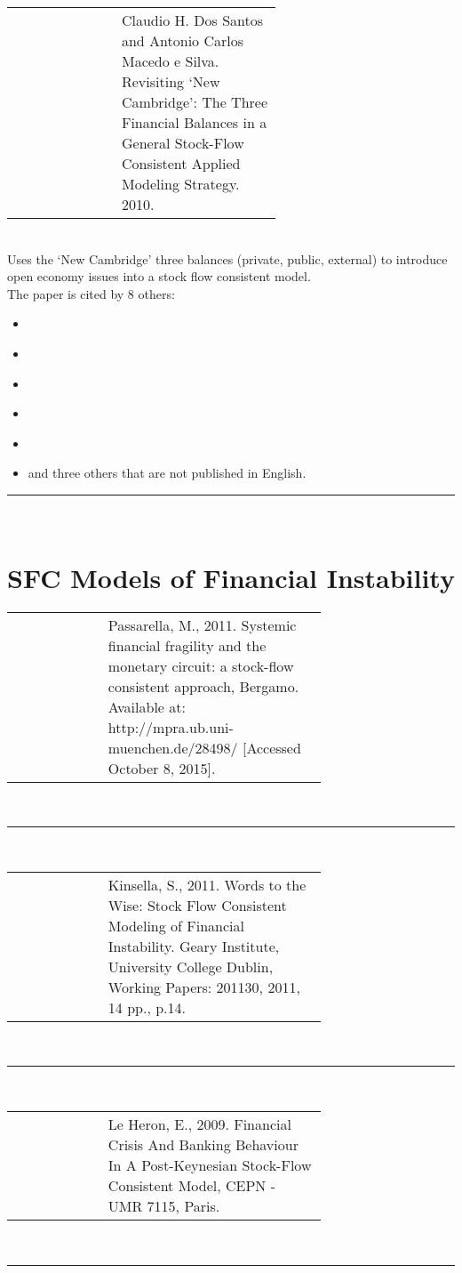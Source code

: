 \documentclass[twoside,a4paper,11pt]{article}
\begin{document}
\raggedright \begin{tabular}{lp{0.6\linewidth}}
\cite{DosSantos2010a} & Claudio H. Dos Santos and Antonio Carlos Macedo e Silva. Revisiting `New Cambridge': The Three Financial Balances in a General Stock-Flow Consistent Applied Modeling Strategy. 2010.
\end{tabular}\\[5pt]
Uses the `New Cambridge'  three balances (private, public, external) to introduce open economy issues into a stock flow consistent model.\\[5pt]
The paper is cited by 8 others:
\begin{itemize}
\item[] \cite{Cripps2011}
\item[] \cite{Shaikh2012}
\item[] \cite{Dafermos2015a}
\item[] \cite{Leite2015}
\item[] \cite{Michell2012}
\item[] and three others that are not published in English.
\end{itemize}
\centering \rule{5cm}{1pt}  \\[1cm]

\raggedright \section{SFC Models of  Financial Instability}
\begin{tabular}{lp{0.7\linewidth}}
\cite{Passarella2011a} & Passarella, M., 2011. Systemic financial fragility and the monetary circuit: a stock-flow consistent approach, Bergamo. Available at: http://mpra.ub.uni-muenchen.de/28498/ [Accessed October 8, 2015].
\end{tabular}\\[5pt]
\centering \rule{5cm}{1pt}  \\[1cm]

\raggedright\begin{tabular}{lp{0.7\linewidth}}
\cite{Kinsella2011} & Kinsella, S., 2011. Words to the Wise: Stock Flow Consistent Modeling of Financial Instability. Geary Institute, University College Dublin, Working Papers: 201130, 2011, 14 pp., p.14.
\end{tabular}\\[5pt]
\centering \rule{5cm}{1pt}  \\[1cm]

\raggedright\begin{tabular}{lp{0.7\linewidth}}
\cite{LeHeron2009a} & Le Heron, E., 2009. Financial Crisis And Banking Behaviour In A Post-Keynesian Stock-Flow Consistent Model, CEPN - UMR 7115, Paris.
\end{tabular}\\[5pt]
\centering \rule{5cm}{1pt}  \\[1cm]
\end{document}
